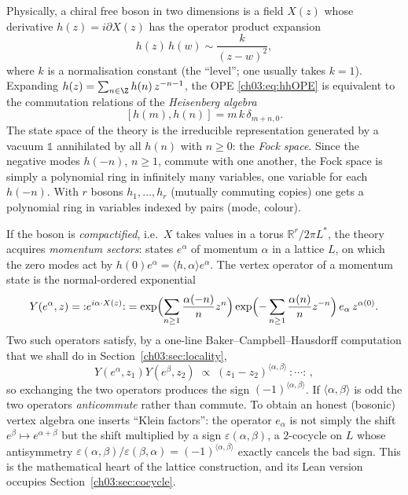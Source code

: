 Physically, a chiral free boson in two dimensions is a field $X(z)$ whose derivative
$h(z)=i\partial X(z)$ has the operator product expansion
\begin{equation}\label{ch03:eq:hhOPE}
  h(z)\,h(w)\sim \frac{k}{(z-w)^2},
\end{equation}
where $k$ is a normalisation constant (the ``level''; one usually takes $k=1$). Expanding
$h(z)=\sum_{n\in\Z} h(n)\,z^{-n-1}$, the OPE \eqref{ch03:eq:hhOPE} is equivalent to the
commutation relations of the \emph{Heisenberg algebra}
\begin{equation}\label{ch03:eq:heis}
  [h(m),h(n)] = m\,k\,\delta_{m+n,0}.
\end{equation}
The state space of the theory is the irreducible representation generated by a vacuum $\mathbb 1$
annihilated by all $h(n)$ with $n\ge 0$: the \emph{Fock space}. Since the negative modes $h(-n)$,
$n\geq1$, commute with one another, the Fock space is simply a polynomial ring in infinitely many
variables, one variable for each $h(-n)$. With $r$ bosons $h_1,\dots,h_r$ (mutually commuting
copies) one gets a polynomial ring in variables indexed by pairs (mode, colour).

If the boson is \emph{compactified}, i.e.\ $X$ takes values in a torus $\mathbb R^r/2\pi L^*$, the
theory acquires \emph{momentum sectors}: states $e^\alpha$ of momentum $\alpha$ in a lattice $L$,
on which the zero modes act by $h(0)e^\alpha=\langle h,\alpha\rangle e^\alpha$. The vertex operator of
a momentum state is the normal-ordered exponential
\begin{equation}\label{ch03:eq:VOphysical}
  Y(e^\alpha,z) = {:}e^{i\alpha\cdot X(z)}{:}
   = \exp\Bigl(\sum_{n\geq1}\frac{\alpha(-n)}{n}z^{n}\Bigr)
     \exp\Bigl(-\sum_{n\geq1}\frac{\alpha(n)}{n}z^{-n}\Bigr)\,e_\alpha\,z^{\alpha(0)} .
\end{equation}
Two such operators satisfy, by a one-line Baker--Campbell--Hausdorff computation that we shall do
in Section~\ref{ch03:sec:locality},
\begin{equation*}
  Y(e^\alpha,z_1)Y(e^\beta,z_2)\;\propto\;(z_1-z_2)^{\langle\alpha,\beta\rangle}\,{:}\cdots{:}\,,
\end{equation*}
so exchanging the two operators produces the sign $(-1)^{\langle\alpha,\beta\rangle}$. If
$\langle\alpha,\beta\rangle$ is odd the two operators \emph{anticommute} rather than commute. To
obtain an honest (bosonic) vertex algebra one inserts ``Klein factors'': the operator $e_\alpha$ is
not simply the shift $e^\beta\mapsto e^{\alpha+\beta}$ but the shift multiplied by a sign
$\varepsilon(\alpha,\beta)$, a $2$-cocycle on $L$ whose antisymmetry
$\varepsilon(\alpha,\beta)/\varepsilon(\beta,\alpha)=(-1)^{\langle\alpha,\beta\rangle}$ exactly
cancels the bad sign. This is the mathematical heart of the lattice construction, and its Lean
version occupies Section~\ref{ch03:sec:cocycle}.

